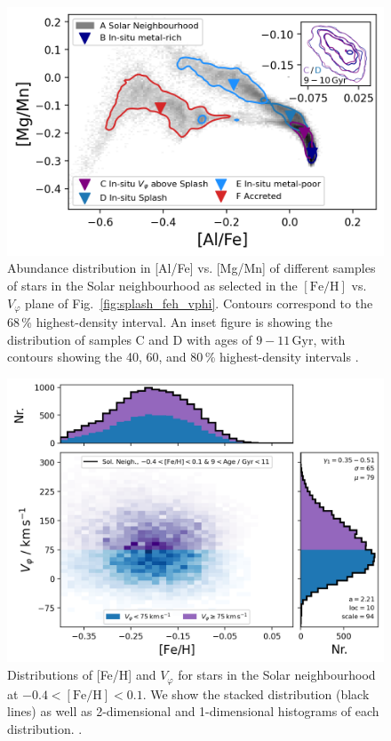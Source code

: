 \documentclass[fleqn,usenatbib]{mnras}
\begin{document}
\begin{figure}
    \centering
    \includegraphics[width=0.9\columnwidth]{figures/splash_alfe_mgmn.png}
    \caption{Abundance distribution in [Al/Fe] vs. [Mg/Mn] of different samples of stars in the Solar neighbourhood as selected in the $\mathrm{[Fe/H]}$ vs. $V_\varphi$ plane of Fig.~\ref{fig:splash_feh_vphi}. Contours correspond to the 68\,\% highest-density interval. An inset figure is showing the distribution of samples C and D with ages of $9-11\,\mathrm{Gyr}$, with contours showing the 40, 60, and 80\,\% highest-density intervals \href{https://github.com/svenbuder/golden_thread_II/tree/main/figures}{\faGithub}.}
    \label{fig:splash_alfe_mgmn}
\end{figure}

\begin{figure}
    \centering
    \includegraphics[width=0.9\columnwidth]{figures/splash_vphi_distribution.png}
    \caption{Distributions of [Fe/H] and $V_\varphi$ for stars in the Solar neighbourhood at $-0.4 < \mathrm{[Fe/H]} < 0.1$. We show the stacked distribution (black lines) as well as 2-dimensional and 1-dimensional histograms of each distribution.
    \href{https://github.com/svenbuder/golden_thread_II/tree/main/figures}{\faGithub}.}
    \label{fig:splash_vphi_distribution}
\end{figure}
\end{document}
